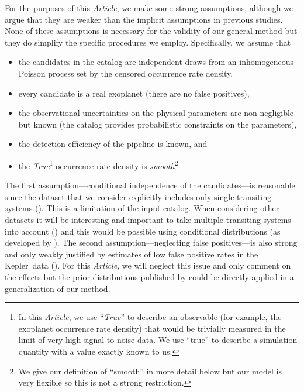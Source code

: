 \documentclass[12pt,preprint]{aastex}
\newcommand{\project}[1]{{\sffamily #1}}
\newcommand{\kepler}{\project{Kepler}}
\newcommand{\paper}{\textsl{Article}}
\newcommand{\foreign}[1]{\emph{#1}}
\newcommand{\True}{\foreign{True}}
\begin{document}
For the purposes of this \paper, we make some strong assumptions, although we
argue that they are weaker than the implicit assumptions in previous
studies.
None of these assumptions is necessary for the validity of our general method
but they do simplify the specific procedures we employ.
Specifically, we assume that
\begin{itemize}

\item the candidates in the catalog are independent draws from an
inhomogeneous Poisson process set by the censored occurrence rate density,

\item every candidate is a real exoplanet (there are no false positives),

\item the observational uncertainties on the physical parameters are
non-negligible but known (the catalog provides probabilistic constraints on
the parameters),

\item the detection efficiency of the pipeline is known, and

\item the \True\footnote{In this \paper, we use ``\True'' to describe an
observable (for example, the exoplanet occurrence rate density) that would be
trivially measured in the limit of very high signal-to-noise data.
We use ``true'' to describe a simulation quantity with a value exactly known
to us.} occurrence rate density is \emph{smooth}\footnote{We give our
definition of ``smooth'' in more detail below but our model is very flexible
so this is not a strong restriction.}.

\end{itemize}
The first assumption---conditional independence of the candidates---is
reasonable since the dataset that we consider explicitly includes only single
transiting systems (\citealt{petigura}).
This is a limitation of the input catalog.
When considering other datasets it will be interesting and important to take
multiple transiting systems into account (\citealt{lissauer, tremaine, fang})
and this would be possible using conditional distributions (as developed by
\citealt{tremaine}).
The second assumption---neglecting false positives---is also strong and only
weakly justified by estimates of low false positive rates in the \kepler\ data
(\citealt{fressin-fp, morton}).
For this \paper, we will neglect this issue and only comment on the effects
but the prior distributions published by \citet{fressin-fp} could be directly
applied in a generalization of our method.
\end{document}
